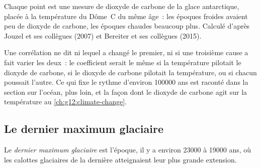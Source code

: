 \begin{omfigure}

{\small Chaque point est une mesure de dioxyde de carbone de la glace
antarctique, placée à la température du Dôme~C du même âge~: les époques
froides avaient peu de dioxyde de carbone, les époques chaudes beaucoup
plus. Calculé d'après Jouzel et ses collègues (2007) et Bereiter et ses
collègues (2015).}
\end{omfigure}

Une corrélation ne dit ni lequel a changé le premier, ni si une troisième
cause a fait varier les deux~: le coefficient serait le même si la
température pilotait le dioxyde de carbone, si le dioxyde de carbone
pilotait la température, ou si chacun poussait l'autre. Ce qui fixe le
rythme d'environ \num{100000} ans est raconté dans la section sur l'océan,
plus loin, et la façon dont le dioxyde de carbone agit sur la température
au \cref{ch:g12:climate-change}.

\subsection{Le dernier maximum glaciaire}

\begin{definition}\label{def:g12:past-climates:lgm}
Le \emph{dernier maximum glaciaire} est
l'époque, il y a environ \num{23000} à \num{19000} ans, où les calottes
glaciaires de la dernière  atteignaient leur plus grande
extension.
\end{definition}


